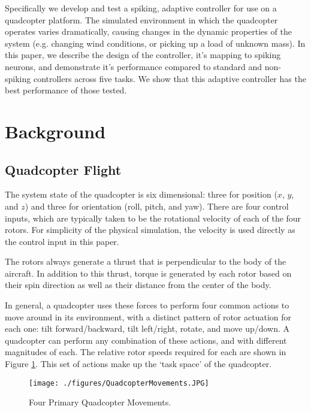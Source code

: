 \documentclass[letterpaper, 10 pt, conference]{ieeeconf}  %
\begin{document}
Specifically we develop and test a spiking, adaptive controller for use on a quadcopter platform.
The simulated environment in which the quadcopter operates varies dramatically, causing changes in the dynamic properties of the system (e.g. changing wind conditions, or picking up a load of unknown mass).
In this paper, we describe the design of the controller, it's mapping to spiking neurons, and demonstrate it's performance compared to standard and non-spiking controllers across five tasks. %
We show that this adaptive controller has the best performance of those tested. %

\section{Background}

\subsection{Quadcopter Flight}

The system state of the quadcopter is six dimensional: three for position ($x$, $y$, and $z$) and three for orientation (roll, pitch, and yaw). 
There are four control inputs, which are typically taken to be the rotational velocity of each of the four rotors. For simplicity of the physical simulation, the velocity is used directly as the control input in this paper. 

The rotors always generate a thrust that is perpendicular to the body of the aircraft. 
In addition to this thrust, torque is generated by each rotor based on their spin direction  as well as their distance from the center of the body.

In general, a quadcopter uses these forces to perform four common actions to move around in its environment, with a distinct pattern of rotor actuation for each one: 
tilt forward/backward, tilt left/right, rotate, and move up/down. 
A quadcopter can perform any combination of these actions, and with different magnitudes of each. The relative rotor speeds required for each are shown in Figure \ref{fig:actions}. This set of actions make up the `task space' of the quadcopter.

\begin{figure}
\centering
\texttt{[image: ./figures/QuadcopterMovements.JPG]}
\caption{Four Primary Quadcopter Movements. \cite{harsha}}
\label{fig:actions}
\end{figure}
\end{document}
